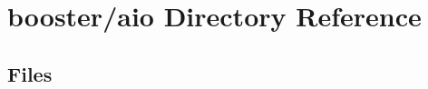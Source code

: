 \section{booster/aio Directory Reference}
\label{dir_6df79130e9ea9b93fd189f47c11fe376}
\subsection*{Files}
\begin{DoxyCompactItemize}
\end{DoxyCompactItemize}
